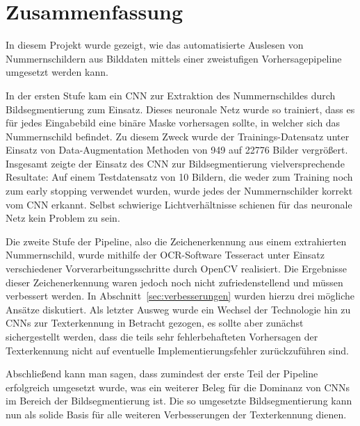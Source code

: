 \section{Zusammenfassung}
\label{sec:zusammenfassung}

In diesem Projekt wurde gezeigt, wie das automatisierte Auslesen
von Nummernschildern aus Bilddaten mittels einer zweistufigen
Vorhersagepipeline umgesetzt werden kann.

In der ersten Stufe kam ein CNN zur Extraktion des Nummernschildes durch
Bildsegmentierung zum Einsatz.
Dieses neuronale Netz wurde so trainiert, dass es f\"ur jedes
Eingabebild eine bin\"are Maske vorhersagen sollte, in welcher
sich das Nummernschild befindet.
Zu diesem Zweck wurde der Trainings-Datensatz unter
Einsatz von Data-Augmentation Methoden von 949 auf 22776 Bilder
vergr\"o{\ss}ert.
Insgesamt zeigte der Einsatz des CNN zur Bildsegmentierung vielversprechende
Resultate: Auf einem Testdatensatz von 10 Bildern, die weder zum Training
noch zum early stopping verwendet wurden, wurde jedes der Nummernschilder
korrekt vom CNN erkannt. Selbst schwierige Lichtverh\"altnisse schienen
f\"ur das neuronale Netz kein Problem zu sein.

Die zweite Stufe der Pipeline, also die Zeichenerkennung aus einem
extrahierten Nummernschild, wurde mithilfe der OCR-Software Tesseract
unter Einsatz verschiedener Vorverarbeitungsschritte durch OpenCV realisiert.
Die Ergebnisse dieser Zeichenerkennung waren jedoch noch nicht
zufriedenstellend und m\"ussen verbessert werden.
In Abschnitt~\ref{sec:verbesserungen} wurden hierzu drei m\"ogliche
Ans\"atze diskutiert. Als letzter Ausweg wurde ein Wechsel der
Technologie hin zu CNNs zur Texterkennung in Betracht gezogen, es sollte
aber zun\"achst sichergestellt werden, dass die teils sehr
fehlerbehafteten Vorhersagen der Texterkennung nicht auf eventuelle
Implementierungsfehler zur\"uckzuf\"uhren sind.

Abschlie{\ss}end kann man sagen, dass zumindest der erste Teil der
Pipeline erfolgreich umgesetzt wurde, was ein weiterer Beleg f\"ur die
Dominanz von CNNs im Bereich der Bildsegmentierung ist.
Die so umgesetzte Bildsegmentierung kann nun als solide Basis f\"ur
alle weiteren Verbesserungen der Texterkennung dienen.
